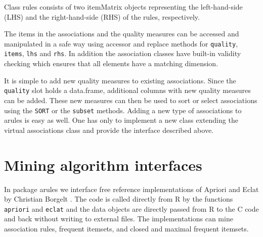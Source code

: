 \documentclass[10pt,a4paper]{article}
\newcommand{\strong}[1]{{\normalfont\fontseries{b}\selectfont #1}}
\newcommand{\class}[1]{\textsf{#1}}
\newcommand{\code}[1]{\texttt{#1}}
\newcommand{\pkg}[1]{\strong{#1}}
\newcommand{\proglang}[1]{\textsf{#1}}
\begin{document}
Class \class{rules} consists of two \class{itemMatrix} objects
representing the left-hand-side (LHS) and the right-hand-side (RHS) of
the rules, respectively.  

The items in the associations and the
quality measures can be accessed
and manipulated in a safe way using accessor and replace methods for
\code{quality}, \code{items}, \code{lhs} and \code{rhs}.  In addition
the association classes have built-in validity checking which ensures
that all elements have a matching dimension.

It is simple to add new quality measures to existing associations.
Since the \code{quality} slot holds a \class{data.frame}, additional
columns with new quality measures can be added.  These new measures can
then be used to sort or select associations using the \code{SORT} or the
\code{subset} methods.  Adding a new type of associations to
\pkg{arules} is easy as well.  One has only to implement a new class
extending the virtual \class{associations} class and provide the
interface described above.


\section{Mining algorithm interfaces\label{sec:interfaces}}

In package \pkg{arules} we interface free reference implementations of
Apriori and Eclat by Christian Borgelt
\citep{arules:Borgelt+Kruse:2002,arules:Borgelt:2003}.  The code is
called directly from \proglang{R} by the functions \code{apriori} and
\code{eclat} and the data objects are directly passed from \proglang{R} to
the \proglang{C} code and back without writing to external files.
The implementations can mine association rules, frequent itemsets,
and closed and maximal frequent itemsets. 
\end{document}
